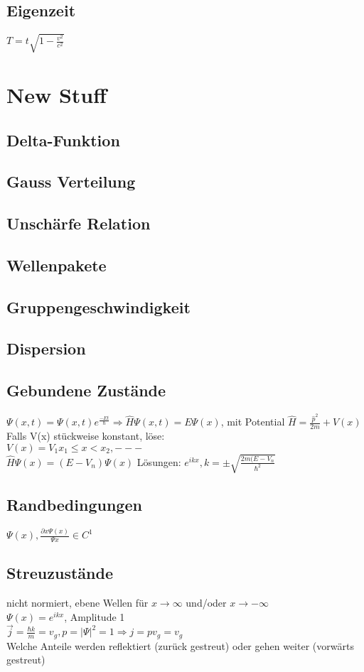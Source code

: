 \documentclass[10pt,a4paper]{article}
\begin{document}
\subsection{Eigenzeit}
$T=t\sqrt{1-\frac{v^2}{c^2}}$
%
\section{New Stuff}
\subsection{Delta-Funktion}
%
\subsection{Gauss Verteilung}
%
\subsection{Unschärfe Relation}
%
\subsection{Wellenpakete}
%
\subsection{Gruppengeschwindigkeit}
%
\subsection{Dispersion}
%
\subsection{Gebundene Zustände}
$\Psi(x,t)=\Psi(x,t)e^{\frac{-Et}{\hbar}}\Rightarrow \hat{H} \Psi(x,t)=E\Psi(x)$, mit Potential $\hat{H}=\frac{\hat{p}^2}{2m}+V(x)$\\
Falls V(x) stückweise konstant, löse:\\
$V(x)=V_1 x_1 \leq x < x_2, ---$\\
$\hat{H}\Psi(x)=(E-V_n)\Psi(x)$ Lösungen: $e^{ikx}, k =\pm\sqrt{\frac{2m(E-V_n}{\hbar^2}}$\\
%
\subsection{Randbedingungen}
$\Psi(x),\frac{\partial x\Psi(x)}{\Psi x} \in C^1$\\
%
\subsection{Streuzustände}
nicht normiert, ebene Wellen für $x\rightarrow \infty$  und/oder $x\rightarrow -\infty$\\
$\Psi(x)=e^{ikx}$, Amplitude 1\\
$\vec{j}=\frac{\hbar k}{m}=v_g, p = |\Psi|^2=1\Rightarrow j = p v_g = v_g$\\
Welche Anteile werden reflektiert (zurück gestreut) oder gehen weiter (vorwärts gestreut)\\
%
\end{document}
